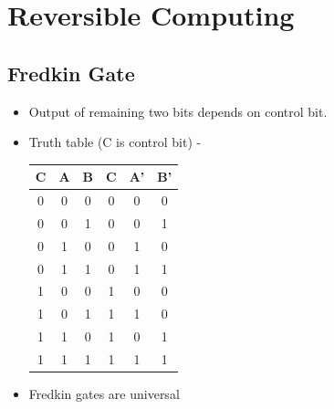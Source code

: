\documentclass[11.5pt, paper=a4]{article}
\theoremstyle{definition}
\numberwithin{theorem}{section}
\begin{document}
\section{Reversible Computing}
\subsection{Fredkin Gate}
    \begin{itemize}
        \item Output of remaining two bits depends on control bit.
        \item Truth table (C is control bit) -
            \begin{center}
            \begin{tabular}{ |c|c|c|c|c|c| }
            \hline
            C & A & B & C & A' & B'\\
            \hline
            0 & 0 & 0 & 0 & 0 & 0\\
            0 & 0 & 1 & 0 & 0 & 1\\
            0 & 1 & 0 & 0 & 1 & 0\\
            0 & 1 & 1 & 0 & 1 & 1\\
            1 & 0 & 0 & 1 & 0 & 0\\
            1 & 0 & 1 & 1 & 1 & 0\\
            1 & 1 & 0 & 1 & 0 & 1\\
            1 & 1 & 1 & 1 & 1 & 1\\
            \hline
            \end{tabular}
            \end{center}
        \item Fredkin gates are universal
    \end{itemize}
\end{document}
